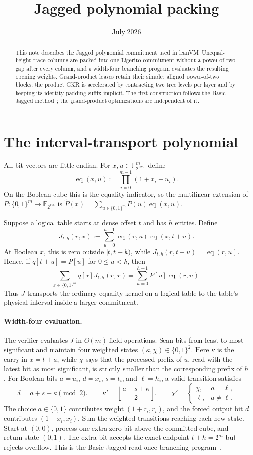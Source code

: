 \documentclass[11pt]{article}
\title{\textbf{Jagged polynomial packing}}
\author{}
\date{July 2026}
\newcommand{\F}{\mathbb F_{2^{128}}}
\newcommand{\cube}[1]{\{0,1\}^{#1}}
\newcommand{\eq}{\operatorname{eq}}
\newcommand{\mle}[1]{\widetilde{#1}}
\begin{document}
\maketitle

\begin{abstract}
\noindent
This note describes the Jagged polynomial commitment used in leanVM. Unequal-height trace columns are packed into one Ligerito commitment without a power-of-two gap after every column, and a width-four branching program evaluates the resulting opening weights. Grand-product leaves retain their simpler aligned power-of-two blocks: the product GKR is accelerated by contracting two tree levels per layer and by keeping its identity-padding suffix implicit. The first construction follows the Basic Jagged method~\cite{Jagged26}; the grand-product optimizations are independent of it.
\end{abstract}

\section{The interval-transport polynomial}

All bit vectors are little-endian. For $x,u\in\F^m$, define
\[
\eq(x,u):=\prod_{i=0}^{m-1}(1+x_i+u_i).
\]
On the Boolean cube this is the equality indicator, so the multilinear extension of $P:\cube m\to\F$ is $\mle P(x)=\sum_{u\in\cube m}P(u)\eq(x,u)$.

Suppose a logical table starts at dense offset $t$ and has $h$ entries. Define
\[
J_{t,h}(r,x):=\sum_{u=0}^{h-1}\eq(r,u)\eq(x,t+u).
\]
At Boolean $x$, this is zero outside $[t,t+h)$, while $J_{t,h}(r,t+u)=\eq(r,u)$. Hence, if $q[t+u]=P[u]$ for $0\leq u<h$, then
\[
\sum_{x\in\cube m}q[x]J_{t,h}(r,x)=\sum_{u=0}^{h-1}P[u]\eq(r,u).
\]
Thus $J$ transports the ordinary equality kernel on a logical table to the table's physical interval inside a larger commitment.

\paragraph{Width-four evaluation.} The verifier evaluates $J$ in $O(m)$ field operations. Scan bits from least to most significant and maintain four weighted states $(\kappa,\chi)\in\cube2$. Here $\kappa$ is the carry in $x=t+u$, while $\chi$ says that the processed prefix of $u$, read with the latest bit as most significant, is strictly smaller than the corresponding prefix of $h$. For Boolean bits $a=u_i$, $d=x_i$, $s=t_i$, and $\ell=h_i$, a valid transition satisfies
\[
d=a+s+\kappa\pmod 2,\qquad \kappa'=\left\lfloor\frac{a+s+\kappa}{2}\right\rfloor,\qquad \chi'=\begin{cases}\chi,&a=\ell,\\ \ell,&a\neq\ell.\end{cases}
\]
The choice $a\in\{0,1\}$ contributes weight $(1+r_i,r_i)$, and the forced output bit $d$ contributes $(1+x_i,x_i)$. Sum the weighted transitions reaching each new state. Start at $(0,0)$, process one extra zero bit above the committed cube, and return state $(0,1)$. The extra bit accepts the exact endpoint $t+h=2^m$ but rejects overflow. This is the Basic Jagged read-once branching program~\cite{Jagged26}.
\end{document}

